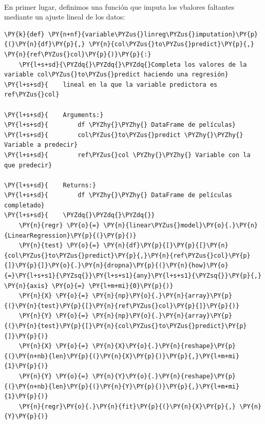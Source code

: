     { \hspace*{\fill} \\}
    
    En primer lugar, definimos una función que imputa los vbalores faltantes
mediante un ajuste lineal de los datos:

    \begin{tcolorbox}[breakable, size=fbox, boxrule=1pt, pad at break*=1mm,colback=cellbackground, colframe=cellborder]
\begin{Verbatim}[commandchars=\\\{\}]
\PY{k}{def} \PY{n+nf}{variable\PYZus{}linreg\PYZus{}imputation}\PY{p}{(}\PY{n}{df}\PY{p}{,} \PY{n}{col\PYZus{}to\PYZus{}predict}\PY{p}{,} \PY{n}{ref\PYZus{}col}\PY{p}{)}\PY{p}{:}
    \PY{l+s+sd}{\PYZdq{}\PYZdq{}\PYZdq{}Completa los valores de la variable col\PYZus{}to\PYZus{}predict haciendo una regresión}
\PY{l+s+sd}{    lineal en la que la variable predictora es ref\PYZus{}col}

\PY{l+s+sd}{    Arguments:}
\PY{l+s+sd}{        df \PYZhy{}\PYZhy{} DataFrame de películas}
\PY{l+s+sd}{        col\PYZus{}to\PYZus{}predict \PYZhy{}\PYZhy{} Variable a predecir}
\PY{l+s+sd}{        ref\PYZus{}col \PYZhy{}\PYZhy{} Variable con la que predecir}

\PY{l+s+sd}{    Returns:}
\PY{l+s+sd}{        df \PYZhy{}\PYZhy{} DataFrame de películas completado}
\PY{l+s+sd}{    \PYZdq{}\PYZdq{}\PYZdq{}}
    \PY{n}{regr} \PY{o}{=} \PY{n}{linear\PYZus{}model}\PY{o}{.}\PY{n}{LinearRegression}\PY{p}{(}\PY{p}{)}
    \PY{n}{test} \PY{o}{=} \PY{n}{df}\PY{p}{[}\PY{p}{[}\PY{n}{col\PYZus{}to\PYZus{}predict}\PY{p}{,}\PY{n}{ref\PYZus{}col}\PY{p}{]}\PY{p}{]}\PY{o}{.}\PY{n}{dropna}\PY{p}{(}\PY{n}{how}\PY{o}{=}\PY{l+s+s1}{\PYZsq{}}\PY{l+s+s1}{any}\PY{l+s+s1}{\PYZsq{}}\PY{p}{,} \PY{n}{axis} \PY{o}{=} \PY{l+m+mi}{0}\PY{p}{)}
    \PY{n}{X} \PY{o}{=} \PY{n}{np}\PY{o}{.}\PY{n}{array}\PY{p}{(}\PY{n}{test}\PY{p}{[}\PY{n}{ref\PYZus{}col}\PY{p}{]}\PY{p}{)}
    \PY{n}{Y} \PY{o}{=} \PY{n}{np}\PY{o}{.}\PY{n}{array}\PY{p}{(}\PY{n}{test}\PY{p}{[}\PY{n}{col\PYZus{}to\PYZus{}predict}\PY{p}{]}\PY{p}{)}
    \PY{n}{X} \PY{o}{=} \PY{n}{X}\PY{o}{.}\PY{n}{reshape}\PY{p}{(}\PY{n+nb}{len}\PY{p}{(}\PY{n}{X}\PY{p}{)}\PY{p}{,}\PY{l+m+mi}{1}\PY{p}{)}
    \PY{n}{Y} \PY{o}{=} \PY{n}{Y}\PY{o}{.}\PY{n}{reshape}\PY{p}{(}\PY{n+nb}{len}\PY{p}{(}\PY{n}{Y}\PY{p}{)}\PY{p}{,}\PY{l+m+mi}{1}\PY{p}{)}
    \PY{n}{regr}\PY{o}{.}\PY{n}{fit}\PY{p}{(}\PY{n}{X}\PY{p}{,} \PY{n}{Y}\PY{p}{)}


\end{Verbatim}
\end{tcolorbox}
